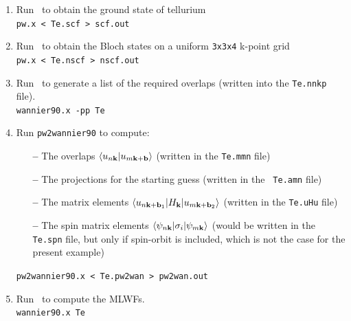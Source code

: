 \documentclass[a4paper,11pt,twoside]{article}
\begin{document}
\begin{enumerate}
\item Run \pwscf\ to obtain the ground state of tellurium\\
{\tt pw.x < Te.scf > scf.out}

\item Run \pwscf\ to obtain the Bloch states on a uniform {\tt 3x3x4} k-point
  grid\\ 
{\tt pw.x < Te.nscf > nscf.out}

\item Run \wannier\ to generate a list of the required overlaps (written
  into the {\tt Te.nnkp} file).\\
{\tt wannier90.x -pp Te}

\item Run {\tt pw2wannier90} to compute:
  \begin{itemize}

  \item[{\bf --}] The overlaps $\langle u_{n{\bf k}}\vert u_{m{\bf k}+{\bf
          b}}\rangle$ (written in the {\tt Te.mmn} file)

  \item[{\bf --}] The projections for the starting guess (written in the {\tt
        Te.amn} file)

  \item[{\bf --}] The matrix elements $\langle u_{n{\bf k}+{\bf b}_1}\vert
      H_{\bf k}\vert u_{m{\bf k}+{\bf b}_2}\rangle$ (written in the
      {\tt Te.uHu} file)

  \item[{\bf --}] The spin matrix elements $\langle \psi_{n{\bf
        k}}\vert \sigma_i\vert \psi_{m{\bf k}}\rangle$ (would be written in the
    {\tt Te.spn} file, but only if spin-orbit is included, which is not the case for the present example)

  \end{itemize}
{\tt pw2wannier90.x < Te.pw2wan > pw2wan.out}

\item Run \wannier\ to compute the MLWFs.\\
{\tt wannier90.x Te}


\end{enumerate}
\end{document}
